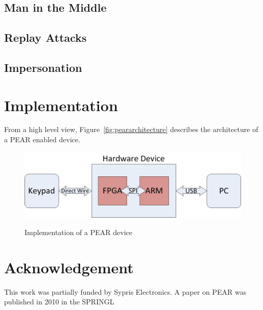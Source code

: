 \subsection{Man in the Middle}

\subsection{Replay Attacks}

\subsection{Impersonation}

\section{Implementation}
From a high level view, Figure~\ref{fig:peararchitecture} describes the architecture of a PEAR enabled device.

\begin{figure}[!ht]
\includegraphics[width=500px]{images/pearimpl.jpg}
\label{fig:peararchitecturet}
\caption{Implementation of a PEAR device}
\end{figure}
\FloatBarrier

\section{Acknowledgement}
This work was partially funded by Sypris Electronics. A paper on PEAR was published in 2010 in the SPRINGL 